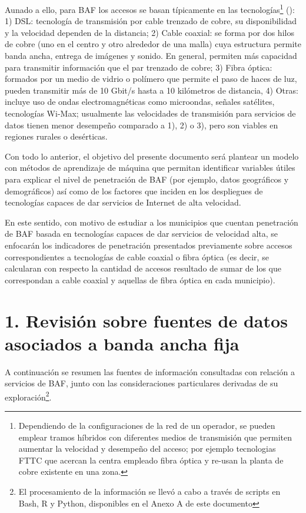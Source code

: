 \documentclass[9pt,twocolumn,twoside]{ilcss}
\begin{document}
Aunado a ello, para BAF los accesos se basan típicamente en las tecnologías\footnote{Dependiendo de la configuraciones de la red de un operador, se pueden emplear tramos híbridos con diferentes medios de transmisión que permiten aumentar la velocidad y desempeño del acceso; por ejemplo tecnologias FTTC que acercan la centra empleado fibra óptica y re-usan la planta de cobre existente en una zona.} (\cite{moya2014telecomunicaciones}): 1) DSL: tecnología de transmisión por cable trenzado de cobre, su disponibilidad y la velocidad dependen de la distancia; 2) Cable coaxial: se forma por dos hilos de cobre (uno en el centro y otro alrededor de una malla) cuya estructura permite banda ancha, entrega de imágenes y sonido. En general, permiten más capacidad para transmitir información que el par trenzado de cobre; 3) Fibra óptica: formados por un medio de vidrio o polímero que permite el paso de haces de luz, pueden transmitir más de 10 Gbit/s hasta a 10 kilómetros de distancia, 4) Otras: incluye uso de ondas electromagnéticas como microondas, señales satélites, tecnologías Wi-Max; usualmente las velocidades de transmisión para servicios de datos tienen menor desempeño comparado a 1), 2) o 3), pero son viables en regiones rurales o desérticas.

Con todo lo anterior, el objetivo del presente documento será plantear un modelo con métodos de aprendizaje de máquina que permitan identificar variables útiles para explicar el nivel de penetración de BAF (por ejemplo, datos geográficos y demográficos) así como de los factores que inciden en los despliegues de tecnologías capaces de dar servicios de Internet de alta velocidad. 

En este sentido, con motivo de estudiar a los municipios que cuentan penetración de BAF basada en tecnologías capaces de dar servicios de velocidad alta, se enfocarán los indicadores de penetración presentados previamente sobre accesos correspondientes a tecnologías de cable coaxial o fibra óptica (es decir, se calcularan con respecto la cantidad de accesos resultado de sumar de los que correspondan a cable coaxial y aquellas de fibra óptica en cada municipio).

\section*{1. Revisión sobre fuentes de datos asociados a banda ancha fija}

A continuación se resumen las fuentes de información consultadas con relación a servicios de BAF, junto con las consideraciones particulares derivadas de su exploración\footnote{El procesamiento de la información se llevó a cabo a través de scripts en Bash, R y Python, disponibles en el Anexo A de este documento}. 
\end{document}
